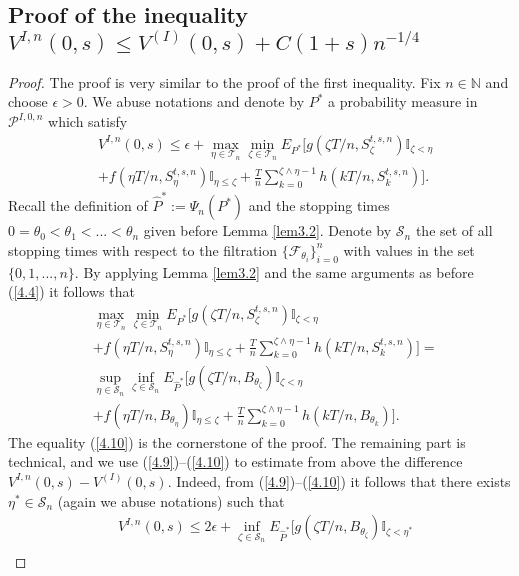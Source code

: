 \documentclass{amsart}
\numberwithin{equation}{section}
\begin{document}
\subsection{Proof of the inequality $V^{I,n}(0,s)\leq V^{(I)}(0,s)+C(1+s) n^{-1/4}$}
\begin{proof}
The proof is very similar to the proof of the first inequality. Fix $n\in\mathbb N$ and choose $\epsilon>0$.
We abuse notations and denote by $P^{*}$ a probability measure in $\mathcal{P}^{I,0,n}$ which satisfy
\begin{eqnarray}\label{4.9}
&V^{I,n}(0,s)\leq \epsilon+ \max_{\eta\in\mathcal T_n}
\min_{\zeta\in\mathcal T_n} E_{P^*}[g(\zeta T/n,S^{t,s,n}_{\zeta})\mathbb{I}_{\zeta<\eta}\\
&+f(\eta T/n,S^{t,s,n}_{\eta})\mathbb{I}_{\eta\leq\zeta}+\frac{T}{n}\sum_{k=0}^{\zeta\wedge\eta-1} h(kT/n,S^{t,s,n}_{k})].\nonumber
\end{eqnarray}
Recall the definition of $\hat P^{*}:=\Psi_n(P^{*})$
and the stopping times $0=\theta_0<\theta_1<...<\theta_n$ given before Lemma \ref{lem3.2}.
Denote by $\mathcal S_n$ the set of all stopping times with respect to the filtration
$\{\mathcal F_{\theta_i}\}_{i=0}^n$ with values in the set $\{0,1,...,n\}$.
By applying Lemma \ref{lem3.2} and the same arguments as before (\ref{4.4}) it follows that
\begin{eqnarray}\label{4.10}
&\max_{\eta\in\mathcal T_n}
\min_{\zeta\in\mathcal T_n} E_{P^{*}}[g(\zeta T/n,S^{t,s,n}_{\zeta})\mathbb{I}_{\zeta<\eta}\\
&+f(\eta T/n,S^{t,s,n}_{\eta})\mathbb{I}_{\eta\leq\zeta}+\frac{T}{n}\sum_{k=0}^{\zeta\wedge\eta-1} h(kT/n,S^{t,s,n}_{k})]=\nonumber\\
&\sup_{\eta\in\mathcal S_n}
\inf_{\zeta\in\mathcal S_n} E_{\hat P^{*}}[g(\zeta T/n,B_{\theta_{\zeta}})\mathbb{I}_{\zeta<\eta}\nonumber\\
&+f(\eta T/n,B_{\theta_{\eta}})\mathbb{I}_{\eta\leq\zeta}+\frac{T}{n}\sum_{k=0}^{\zeta\wedge\eta-1} h(kT/n,B_{\theta_k})].\nonumber
\end{eqnarray}
The equality (\ref{4.10}) is the cornerstone of the proof. The remaining part is technical, and we use
(\ref{4.9})--(\ref{4.10}) to estimate from above the difference
$V^{I,n}(0,s)-V^{(I)}(0,s)$. Indeed,
from (\ref{4.9})--(\ref{4.10}) it follows that there exists $\eta^{*}\in\mathcal S_n$ (again we abuse notations)
such that
\begin{eqnarray}\label{4.11}
&V^{I,n}(0,s)\leq 2\epsilon+ \inf_{\zeta\in\mathcal S_n}
E_{\hat P^*}[g(\zeta T/n,B_{\theta_{\zeta}})\mathbb{I}_{\zeta<\eta^*}\nonumber\\

\end{eqnarray}
\end{proof}
\end{document}
